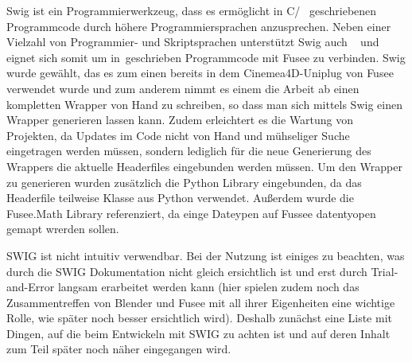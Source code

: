  \label{sec:Umsetzung}


Swig ist ein Programmierwerkzeug, dass es ermöglicht in C/\CC~ geschriebenen Programmcode durch höhere Programmiersprachen anzusprechen. Neben einer Vielzahl von Programmier- und Skriptsprachen unterstützt Swig auch \CS~ und eignet sich somit um in\CC~geschrieben Programmcode mit Fusee zu verbinden. Swig wurde gewählt, das es zum einen bereits in dem Cinemea4D-Uniplug von Fusee verwendet wurde und zum anderem nimmt es einem die Arbeit ab einen kompletten Wrapper von Hand zu schreiben, so dass man sich mittels Swig einen Wrapper generieren lassen kann. Zudem erleichtert es die Wartung von Projekten, da Updates im Code nicht von Hand und mühseliger Suche eingetragen werden müssen, sondern lediglich für die neue Generierung des Wrappers die aktuelle Headerfiles eingebunden werden müssen.
Um den Wrapper zu generieren wurden zusätzlich die Python Library eingebunden, da das Headerfile teilweise Klasse aus Python verwendet.  Außerdem wurde die Fusee.Math Library referenziert, da einge Dateypen auf Fussee datentyopen gemapt wrerden sollen.


SWIG ist nicht intuitiv verwendbar. Bei der Nutzung ist einiges zu beachten, was durch die SWIG Dokumentation nicht gleich ersichtlich ist und erst durch Trial-and-Error langsam erarbeitet werden kann (hier spielen zudem noch das Zusammentreffen von Blender und Fusee mit all ihrer Eigenheiten eine wichtige Rolle, wie später noch besser ersichtlich wird). Deshalb zunächst eine Liste mit Dingen, auf die beim Entwickeln mit SWIG zu achten ist und auf deren Inhalt zum Teil später noch näher eingegangen wird.


